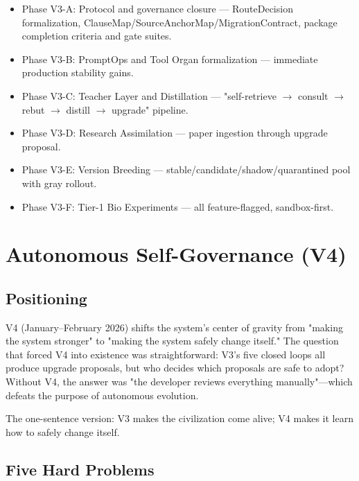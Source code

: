 \documentclass[12pt,a4paper]{article}
\begin{document}
\begin{itemize}
  \item Phase V3-A: Protocol and governance closure --- RouteDecision formalization, ClauseMap/SourceAnchorMap/MigrationContract, package completion criteria and gate suites.
  \item Phase V3-B: PromptOps and Tool Organ formalization --- immediate production stability gains.
  \item Phase V3-C: Teacher Layer and Distillation --- "self-retrieve $\rightarrow$ consult $\rightarrow$ rebut $\rightarrow$ distill $\rightarrow$ upgrade" pipeline.
  \item Phase V3-D: Research Assimilation --- paper ingestion through upgrade proposal.
  \item Phase V3-E: Version Breeding --- stable/candidate/shadow/quarantined pool with gray rollout.
  \item Phase V3-F: Tier-1 Bio Experiments --- all feature-flagged, sandbox-first.
\end{itemize}


\section{Autonomous Self-Governance (V4)}


\subsection{Positioning}


V4 (January--February 2026) shifts the system's center of gravity from "making the system stronger" to "making the system safely change itself." The question that forced V4 into existence was straightforward: V3's five closed loops all produce upgrade proposals, but who decides which proposals are safe to adopt? Without V4, the answer was "the developer reviews everything manually"---which defeats the purpose of autonomous evolution.

The one-sentence version: V3 makes the civilization come alive; V4 makes it learn how to safely change itself.

\subsection{Five Hard Problems}
\end{document}
